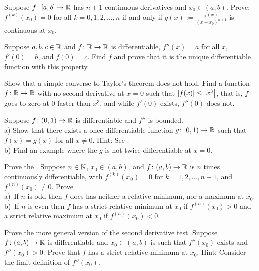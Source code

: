 \begin{exercise}
Suppose $f \colon [a,b] \to {\mathbb{R}}$ has $n+1$ continuous derivatives
and $x_0 \in (a,b)$.
Prove: $f^{(k)}(x_0) = 0$ for all $k = 0, 1, 2, \ldots, n$
if and only if $g(x) := \frac{f(x)}{{(x-x_0)}^{n+1}}$ is continuous at $x_0$.
\end{exercise}

\begin{exercise}
Suppose $a,b,c \in {\mathbb{R}}$ and $f \colon {\mathbb{R}} \to {\mathbb{R}}$ is differentiable,
$f''(x) = a$ for all $x$, $f'(0) = b$, and $f(0) = c$.  Find $f$ and prove that 
it is the unique differentiable function with this property.
\end{exercise}

\begin{exercise}[Challenging]
Show that a simple converse to Taylor's theorem does not hold.
Find a function $f \colon {\mathbb{R}} \to {\mathbb{R}}$ with no second derivative at $x=0$ such that
$\left\lvert {f(x)} \right\rvert \leq \left\lvert {x^3} \right\rvert$, that is, $f$ goes to zero at 0 faster than $x^3$, and
while $f'(0)$ exists, $f''(0)$ does not.
\end{exercise}

\begin{exercise} \label{exercise:extendboundedder2}
Suppose $f \colon (0,1) \to {\mathbb{R}}$ is differentiable and $f''$
is bounded.\\
a) Show that there exists a once differentiable function $g \colon [0,1) \to {\mathbb{R}}$
such that $f(x) = g(x)$ for all $x \not= 0$.  Hint: 
See
.
\\
b) Find an example where the $g$ is not twice differentiable at $x=0$.
\end{exercise}

\begin{exercise}
Prove the \emph{}.  Suppose $n \in {\mathbb{N}}$,
$x_0 \in (a,b)$, and $f \colon (a,b) \to {\mathbb{R}}$ is $n$ times continuously
differentiable, with $f^{(k)}(x_0) = 0$ for $k=1,2,\ldots,n-1$, and
$f^{(n)}(x_0)
\not= 0$.
Prove\\
a)~If $n$ is odd then $f$ does has neither a relative minimum,
nor a maximum at $x_0$.
\\
b)~If $n$ is even then $f$ has a strict relative minimum at $x_0$ if
$f^{(n)}(x_0) > 0$
and a strict relative maximum at $x_0$ if $f^{(n)}(x_0) < 0$.
\end{exercise}

\begin{exercise}
Prove the more general version of the second derivative test.
Suppose $f \colon (a,b) \to {\mathbb{R}}$ is differentiable and $x_0 \in (a,b)$
is such that $f''(x_0)$ exists and $f''(x_0) > 0$.
Prove that $f$ has a strict relative
minimum at $x_0$.  Hint: Consider the limit definition of $f''(x_0)$.
\end{exercise}

